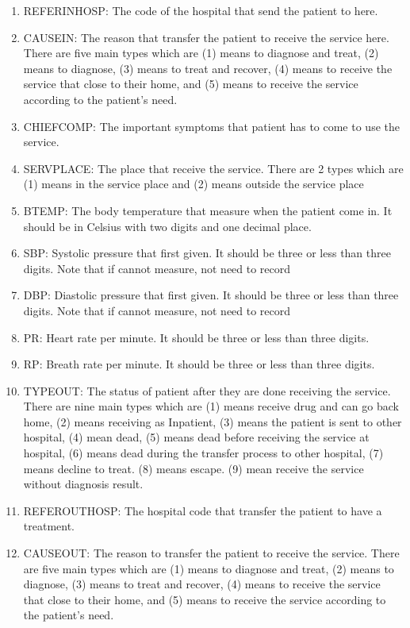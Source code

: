 \begin{enumerate}
  \item REFERINHOSP: The code of the hospital that send the patient to here. 
  \item CAUSEIN: The reason that transfer the patient to receive the service here. There are five main types which are (1) means to diagnose and treat, (2) means to diagnose, (3) means to treat and recover, (4) means to receive the service that close to their home, and (5) means to receive the service according to the patient's need.
  \item CHIEFCOMP: The important symptoms that patient has to come to use the service.
  \item SERVPLACE: The place that receive the service. There are 2 types which are (1) means in the service place and (2) means outside the service place
  \item BTEMP: The body temperature that measure when the patient come in. It should be in Celsius with two digits and one decimal place.
  \item SBP: Systolic pressure that first given. It should be three or less than three digits. Note that if cannot measure, not need to record
  \item DBP: Diastolic pressure that first given. It should be three or less than three digits. Note that if cannot measure, not need to record
  \item PR: Heart rate per minute. It should be three or less than three digits.
  \item RP: Breath rate per minute. It should be three or less than three digits.
  \item TYPEOUT: The status of patient after they are done receiving the service. There are nine main types which are (1) means receive drug and can go back home, (2) means receiving as Inpatient, (3) means the patient is sent to other hospital, (4) mean dead, (5) means dead before receiving the service at hospital, (6) means dead during the transfer process to other hospital, (7) means decline to treat. (8) means escape. (9) mean receive the service without diagnosis result.
  \item REFEROUTHOSP: The hospital code that transfer the patient to have a treatment.
  \item CAUSEOUT: The reason to transfer the patient to receive the service. There are five main types which are (1) means to diagnose and treat, (2) means to diagnose, (3) means to treat and recover, (4) means to receive the service that close to their home, and (5) means to receive the service according to the patient's need.

\end{enumerate}
